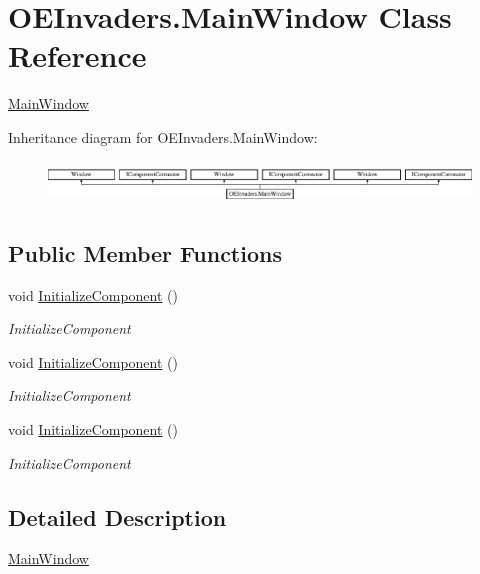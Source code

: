 \hypertarget{class_o_e_invaders_1_1_main_window}{}\section{O\+E\+Invaders.\+Main\+Window Class Reference}
\label{class_o_e_invaders_1_1_main_window}


\mbox{\hyperlink{class_o_e_invaders_1_1_main_window}{Main\+Window}}  


Inheritance diagram for O\+E\+Invaders.\+Main\+Window\+:\begin{figure}[H]
\begin{center}
\leavevmode
\includegraphics[height=1.145194cm]{class_o_e_invaders_1_1_main_window}
\end{center}
\end{figure}
\subsection*{Public Member Functions}
\begin{DoxyCompactItemize}
\item 
void \mbox{\hyperlink{class_o_e_invaders_1_1_main_window_a8129bd0c591cd4c13e8cea86202d4d06}{Initialize\+Component}} ()
\begin{DoxyCompactList}\small\item\em Initialize\+Component \end{DoxyCompactList}\item 
void \mbox{\hyperlink{class_o_e_invaders_1_1_main_window_a8129bd0c591cd4c13e8cea86202d4d06}{Initialize\+Component}} ()
\begin{DoxyCompactList}\small\item\em Initialize\+Component \end{DoxyCompactList}\item 
void \mbox{\hyperlink{class_o_e_invaders_1_1_main_window_a8129bd0c591cd4c13e8cea86202d4d06}{Initialize\+Component}} ()
\begin{DoxyCompactList}\small\item\em Initialize\+Component \end{DoxyCompactList}\end{DoxyCompactItemize}


\subsection{Detailed Description}
\mbox{\hyperlink{class_o_e_invaders_1_1_main_window}{Main\+Window}} 



